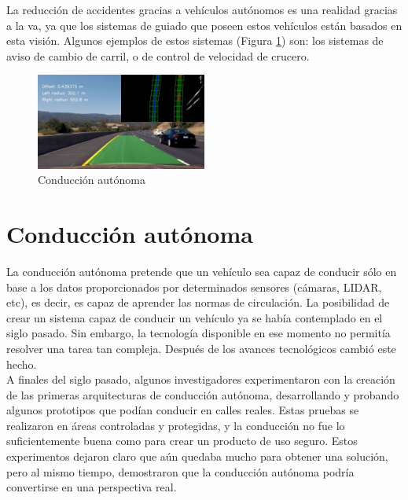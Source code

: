 La reducción de accidentes gracias a vehículos autónomos es una realidad gracias a la \acrshort{va}, ya que los sistemas de guiado que poseen estos vehículos están basados en esta visión. Algunos ejemplos de estos sistemas (Figura \ref{fig.car}) son: los sistemas de aviso de cambio de carril, o de control de velocidad de crucero. 

\begin{figure}[H]
  \begin{center}
    \includegraphics[width=0.5\textwidth]{figures/Introduccion/car.jpg}
		\caption{Conducción autónoma}
		\label{fig.car}
		\end{center}
\end{figure}


\section{Conducción autónoma}

La conducción autónoma pretende que un vehículo sea capaz de conducir sólo en base a los datos proporcionados por determinados sensores (cámaras, LIDAR, etc), es decir, es capaz de aprender las normas de circulación. La posibilidad de crear un sistema capaz de conducir un vehículo ya se había contemplado en el siglo pasado. Sin embargo, la tecnología disponible en ese momento no permitía resolver una tarea tan compleja. Después de los avances tecnológicos cambió este hecho.\\

A finales del siglo pasado, algunos investigadores \cite{Dickmanns} \cite{alvinn} experimentaron con la creación de las primeras arquitecturas de conducción autónoma, desarrollando y probando algunos prototipos que podían conducir en calles reales. Estas pruebas se realizaron en áreas controladas y protegidas, y la conducción no fue lo suficientemente buena como para crear un producto de uso seguro. Estos experimentos dejaron claro que aún quedaba mucho para obtener una solución, pero al mismo tiempo, demostraron que la conducción autónoma podría convertirse en una perspectiva real.\\

